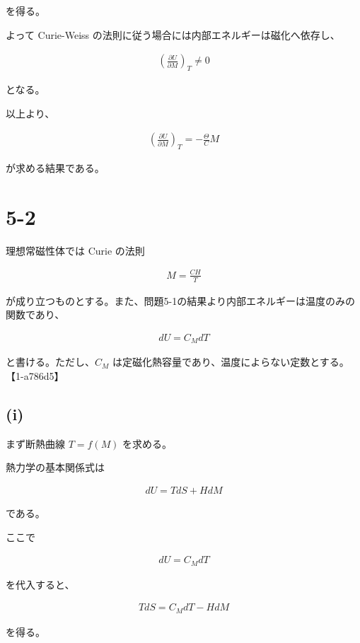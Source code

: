 \documentclass[platex,dvipdfmx,a4paper]{jsarticle}
\begin{document}
を得る。

よって Curie-Weiss の法則に従う場合には内部エネルギーは磁化へ依存し、

\begin{align*}
\left(
\frac{\partial U}{\partial M}
\right)_T
\neq 0
\end{align*}

となる。

以上より、

\begin{align*}
\left(
\frac{\partial U}{\partial M}
\right)_T
=
-\frac{\Theta}{C}M
\end{align*}

が求める結果である。
\section{5-2}

理想常磁性体では Curie の法則

\begin{align*}
M=\frac{CH}{T}
\end{align*}

が成り立つものとする。また、問題5-1の結果より内部エネルギーは温度のみの関数であり、

\begin{align*}
dU=C_MdT
\end{align*}

と書ける。ただし、$C_M$ は定磁化熱容量であり、温度によらない定数とする。 【1-a786d5】

\subsection{(i)}

まず断熱曲線 $T=f(M)$ を求める。

熱力学の基本関係式は

\begin{align*}
dU
=
TdS+HdM
\end{align*}

である。

ここで

\begin{align*}
dU=C_MdT
\end{align*}

を代入すると、

\begin{align*}
TdS
=
C_MdT-HdM
\end{align*}

を得る。
\end{document}
